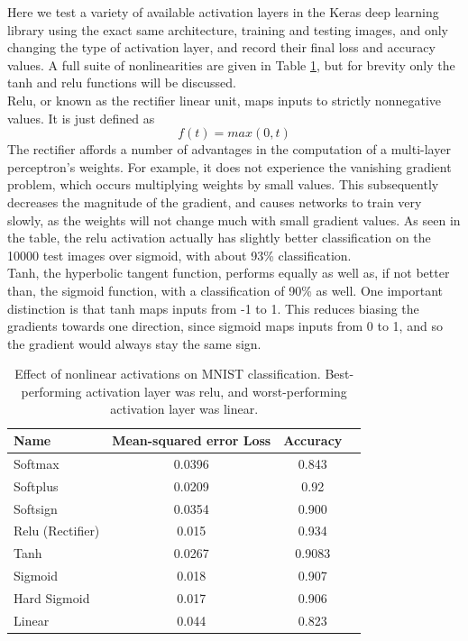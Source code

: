 \documentclass{article}
\begin{document}
Here we test a variety of available activation layers in the Keras deep learning library using the exact same architecture, training and testing images, and only changing the type of activation layer, and record their final loss and accuracy values. A full suite of nonlinearities are given in Table \ref{tab:nonlinear}, but for brevity only the tanh and relu functions will be discussed. \\

Relu, or known as the rectifier linear unit, maps inputs to strictly nonnegative values. It is just defined as 
\[
    f(t) = max(0, t)
\]
The rectifier affords a number of advantages in the computation of a multi-layer perceptron's weights. For example, it does not experience the vanishing gradient problem, which occurs multiplying weights by small values. This subsequently decreases the magnitude of the gradient, and causes networks to train very slowly, as the weights will not change much with small gradient values. As seen in the table, the relu activation actually has slightly better classification on the 10000 test images over sigmoid, with about 93\% classification. \\
Tanh, the hyperbolic tangent function, performs equally as well as, if not better than, the sigmoid function, with a classification of 90\% as well. One important distinction is that tanh maps inputs from -1 to 1. This reduces biasing the gradients towards one direction, since sigmoid maps inputs from 0 to 1, and so the gradient would always stay the same sign. 
\begin{table}[H]
    \label{tab:nonlinear}
    \centering

    \begin{tabular}{|l|c|c|c|}
    \hline

    \hline
    \textbf{Name} & \textbf{Mean-squared error Loss} & \textbf{Accuracy} \\
    \hline
    Softmax & 0.0396 & 0.843  \\
    \hline
    Softplus & 0.0209 & 0.92 \\
    \hline
    Softsign & 0.0354 & 0.900 \\
    \hline
    Relu (Rectifier) & 0.015 & 0.934 \\
    \hline
    Tanh & 0.0267 & 0.9083 \\
    \hline
    Sigmoid & 0.018 & 0.907 \\
    \hline
    Hard Sigmoid & 0.017 & 0.906 \\
    \hline
    Linear & 0.044 & 0.823 \\
    \hline
    \end{tabular}
    \caption{Effect of nonlinear activations on MNIST classification. Best-performing activation layer was relu, and worst-performing activation layer was linear.}
\end{table}
\end{document}
